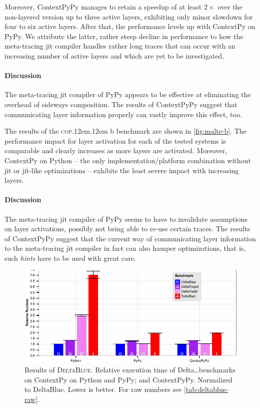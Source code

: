\documentclass[preprint,english,10pt,nonatbib]{sigplanconf}
\DeclareRobustCommand*\copb{\textsc{cop}\kern .12em\oldstylenums{09}\kern .12em b\xspace}
\DeclareRobustCommand*\deltablue{\textsc{DeltaBlue}\xspace}
\begin{document}
Moreover, ContextPyPy manages to retain a speedup of at least \(2\times\)
over the non-layered version up to three active layers, exhibiting only minor
slowdown for four to six active layers. After that, the performance levels up
with ContextPy on PyPy. We attribute the latter, rather steep decline in
performance to how the meta-tracing \ac{jit} compiler handles rather long
traces that can occur with an increasing number of active layers and which are
yet to be investigated.

\paragraph{Discussion} The meta-tracing \ac{jit} compiler of PyPy appears to be
effective at eliminating the overhead of sideways composition. The results of
ContextPyPy suggest that communicating layer information properly can vastly
improve this effect, too.
%

\medskip\noindent %
The results of the \copb benchmark are shown in \autoref{fig:malte-b}. The
performance impact for layer activation for each of the tested systems is
comparable and clearly increases as more layers are activated. Moreover,
ContextPy on Python \--- the only implementation/platform combination without
\ac{jit} or \ac{jit}-like optimizations \--- exhibits the least severe impact
with increasing layers.

\paragraph{Discussion} The meta-tracing \ac{jit} compiler of PyPy seems to have
to invalidate assumptions on layer activations, possibly not being able to
re-use certain traces. The results of ContextPyPy suggest that the current way
of communicating layer information to the meta-tracing \ac{jit} compiler in
fact can also hamper optimizations, that is, such \emph{hints} have to
be used with great care.

\begin{figure}
  \centering
  \includegraphics[width=.66\linewidth]{bench/DeltaBlue-norm.pdf}
  \caption{Results of \deltablue. Relative execution time of Delta\ldots benchmarks
    on ContextPy on Python and PyPy; and ContextPyPy. Normalized to DeltaBlue.
    Lower is better. For raw numbers see \autoref{tab:deltablue-raw}.}
  \label{fig:deltablue}
\end{figure}
\end{document}
